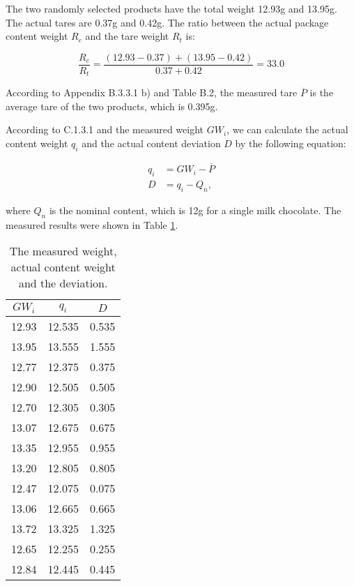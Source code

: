 \documentclass[conf]{new-aiaa}
\begin{document}
The two randomly selected products have the total weight 12.93g and 13.95g. The actual tares are 0.37g and 0.42g. The ratio between the actual package content weight $R_c$ and the tare weight $R_t$ is:

$$
  \frac{R_c}{R_t} = \frac{(12.93-0.37)+(13.95-0.42)}{0.37+0.42}=33.0
$$

According to Appendix B.3.3.1 b) and Table B.2, the measured tare $\overline{P}$ is the average tare of the two products, which is 0.395g.\medskip

According to C.1.3.1 and the measured weight $GW_i$, we can calculate the actual content weight $q_i$ and the actual content deviation $D$ by the following equation:

\begin{align*}
q_i &= GW_i - \overline{P}\\
D &= q_i - Q_n,
\end{align*}

where $Q_n$ is the nominal content, which is 12g for a single milk chocolate. The measured results were shown in Table \ref{tab:weight}.

\begin{table}[H]
  \centering
  \caption{The measured weight, actual content weight and the deviation.}
    \begin{tabular}{|c|c|c|}
    \hline
    $GW_i$ & $q_i$  & $D$ \\
    \hline
    12.93  & 12.535 & 0.535 \\\hline
    13.95  & 13.555 & 1.555 \\\hline
    12.77  & 12.375 & 0.375 \\\hline
    12.90  & 12.505 & 0.505 \\\hline
    12.70  & 12.305 & 0.305 \\\hline
    13.07  & 12.675 & 0.675 \\\hline
    13.35  & 12.955 & 0.955 \\\hline
    13.20  & 12.805 & 0.805 \\\hline
    12.47  & 12.075 & 0.075 \\\hline
    13.06  & 12.665 & 0.665 \\\hline
    13.72  & 13.325 & 1.325 \\\hline
    12.65  & 12.255 & 0.255 \\\hline
    12.84  & 12.445 & 0.445 \\\hline
    \end{tabular}%
  \label{tab:weight}%
\end{table}%
\end{document}
